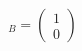 \documentclass[preview]{standalone}
\begin{document}
\begin{align*}
[u]_B = \begin{pmatrix} 1 \\ 0 \end{pmatrix}
\end{align*}
\end{document}

